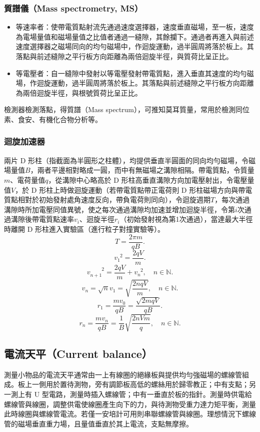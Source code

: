 \documentclass[a4paper,12pt]{report}
\begin{document}
\begin{itemize}
\subsubsection{質譜儀（Mass spectrometry, MS）}
\begin{itemize}
\item 等速率者：使帶電質點射流先通過速度選擇器，速度垂直磁場，至一板，速度為電場量值和磁場量值之比值者通過一縫隙，其餘攔下。通過者再進入與前述速度選擇器之磁場同向的均勻磁場中，作迴旋運動，過半圓周將落於板上。其落點與前述縫隙之平行板方向距離為兩倍迴旋半徑，與質荷比呈正比。
\item 等電壓者：自一縫隙中發射以等電壓發射帶電質點，進入垂直其速度的均勻磁場，作迴旋運動，過半圓周將落於板上。其落點與前述縫隙之平行板方向距離為兩倍迴旋半徑，與根號質荷比呈正比。
\end{itemize}
檢測器檢測落點，得質譜（Mass spectrum），可推知莫耳質量，常用於檢測同位素、食安、有機化合物分析等。
\subsubsection{迴旋加速器}
兩片 D 形柱（指截面為半圓形之柱體），均提供垂直半圓面的同向均勻磁場，令磁場量值$B$，兩者平邊相對略成一圓，而中有無磁場之溝隙相隔。帶電質點，令質量$m$、電荷量值$q$，從溝隙中心略高於 D 形柱高垂直溝隙方向加電壓射出，令電壓量值$V$，於 D 形柱上時做迴旋運動（若帶電質點帶正電荷則 D 形柱磁場方向與帶電質點相對於初始發射處角速度反向，帶負電荷則同向），令迴旋週期$T$，每次通過溝隙時所加電壓同值異號，使之每次通過溝隙均加速並增加迴旋半徑，令第$i$次通過溝隙後帶電質點速率$v_i$、迴旋半徑$r_i$（初始發射視為第1次通過），當達最大半徑時離開 D 形柱進入實驗區（進行粒子對撞實驗等）。
\[T=\frac{2\pi m}{qB}.\]
\[v_1^{\phantom{0}2}=\frac{2qV}{m}.\]
\[v_{n+1}^{\phantom{n+1}2}=\frac{2qV}{m}+v_n^{\phantom{n}2},\quad n\in\mathbb{N}.\]
\[v_n=\sqrt{n}v_1=\sqrt{\frac{2nqV}{m}},\quad n\in\mathbb{N}.\]
\[r_1=\frac{mv_0}{qB}=\frac{\sqrt{2mqV}}{qB}.\]
\[r_n=\frac{mv_n}{qB}=\frac{1}{B}\sqrt{\frac{2nVm}{q}},\quad n\in\mathbb{N}.\]
\subsection{電流天平（Current balance）}
測量小物品的電流天平通常由一上有線圈的絕緣板與提供均勻強磁場的螺線管組成。板上一側用於置待測物，旁有調節板高低的螺絲用於歸零教正；中有支點；另一測上有 U 型電路，測量時插入螺線管；中有一垂直於板的指針。測量時供電給螺線管與線圈，調整供電使線圈產生向下的力，與待測物受重力達力矩平衡，測量此時線圈與螺線管電流。若僅一安培計可用則串聯螺線管與線圈。理想情況下螺線管的磁場垂直重力場，且量值垂直於其上電流，支點無摩擦。


\end{itemize}
\end{document}

